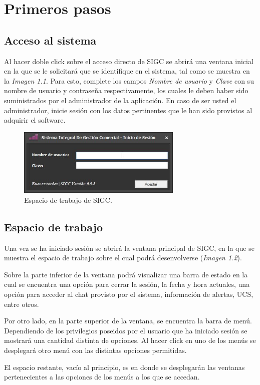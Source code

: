 \documentclass{book}
\begin{document}
\tableofcontents
\newpage
\thispagestyle{empty}
\thispagestyle{empty}
\thispagestyle{empty}



%
%
\chapter{Primeros pasos}


\section{Acceso al sistema}

Al hacer doble click sobre el acceso directo de SIGC se abrirá una ventana inicial en la que se le solicitará que se identifique en el sistema, tal como se muestra en la \textit{Imagen 1.1}. Para esto, complete los campos \textit{Nombre de usuario} y \textit{Clave} con su nombre de usuario y contraseña respectivamente, los cuales le deben haber sido suministrados por el administrador de la aplicación. En caso de ser usted el administrador, inicie sesión con los datos pertinentes que le han sido provistos al adquirir el software.
\bigskip

\begin{figure}[H]
	\centering
	\includegraphics[width=0.70\textwidth]{images/ventanas/ventana-01.jpg}
	\medskip
	\caption{Espacio de trabajo de SIGC.}
\end{figure}
\bigskip


\section{Espacio de trabajo}

Una vez se ha iniciado sesión se abrirá la ventana principal de SIGC, en la que se muestra el espacio de trabajo sobre el cual podrá desenvolverse (\textit{Imagen 1.2}). 
\par
Sobre la parte inferior de la ventana podrá visualizar una barra de estado en la cual se encuentra una opción para cerrar la sesión, la fecha y hora actuales, una opción para acceder al chat provisto por el sistema, información de alertas, UCS, entre otros.
\par
Por otro lado, en la parte superior de la ventana, se encuentra la barra de menú. Dependiendo de los privilegios poseidos por el usuario que ha iniciado sesión se mostrará una cantidad distinta de opciones. Al hacer click en uno de los menús se desplegará otro menú con las distintas opciones permitidas.
\par
El espacio restante, vacío al principio, es en donde se desplegarán las ventanas pertenecientes a las opciones de los menús a los que se accedan.
\bigskip
\end{document}
